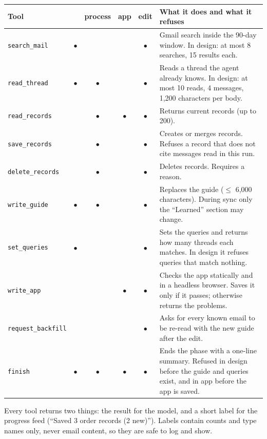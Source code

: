 \documentclass[10pt,a4paper]{article}
\newcommand{\code}[1]{\texttt{\small #1}}
\begin{document}
\begin{center}\small
\begin{tabularx}{\linewidth}{@{}P{2.7cm}cccc@{\hspace{8pt}}L@{}}
\toprule
\textbf{Tool} &  & \textbf{process} & \textbf{app} & \textbf{edit} & \textbf{What it does and what it refuses} \\
\midrule
\code{search\_mail} & $\bullet$ & & & $\bullet$ & Gmail search inside the 90-day window. In design: at most 8 searches, 15 results each. \\
\code{read\_thread} & $\bullet$ & $\bullet$ & & $\bullet$ & Reads a thread the agent already knows. In design: at most 10 reads, 4 messages, 1,200 characters per body. \\
\code{read\_records} & & $\bullet$ & $\bullet$ & $\bullet$ & Returns current records (up to 200). \\
\code{save\_records} & & $\bullet$ & & $\bullet$ & Creates or merges records. Refuses a record that does not cite messages read in this run. \\
\code{delete\_records} & & $\bullet$ & & $\bullet$ & Deletes records. Requires a reason. \\
\code{write\_guide} & $\bullet$ & $\bullet$ & & $\bullet$ & Replaces the guide ($\le$ 6,000 characters). During sync only the ``Learned'' section may change. \\
\code{set\_queries} & $\bullet$ & & & $\bullet$ & Sets the queries and returns how many threads each matches. In design it refuses queries that match nothing. \\
\code{write\_app} & & & $\bullet$ & $\bullet$ & Checks the app statically and in a headless browser. Saves it only if it passes; otherwise returns the problems. \\
\code{request\_backfill} & & & & $\bullet$ & Asks for every known email to be re-read with the new guide after the edit. \\
\code{finish} & $\bullet$ & $\bullet$ & $\bullet$ & $\bullet$ & Ends the phase with a one-line summary. Refused in design before the guide and queries exist, and in app before the app is saved. \\
\bottomrule
\end{tabularx}
\end{center}

Every tool returns two things: the result for the model, and a short label for the progress
feed (``Saved 3 order records (2 new)''). Labels contain counts and type names only, never
email content, so they are safe to log and show.
\end{document}

